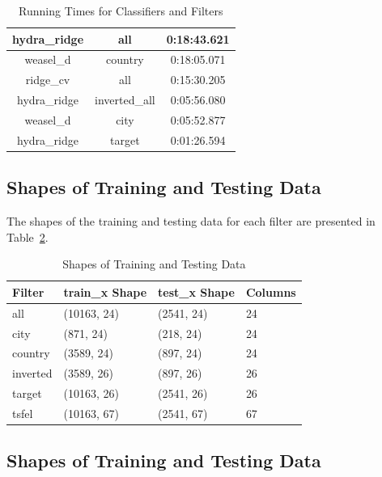 \documentclass{ieeeaccess}
\begin{document}
\begin{table}[ht]
\begin{tabular}{|c|c|c|}
    hydra\_ridge              & all               & 0:18:43.621                     \\ \hline
    weasel\_d                 & country           & 0:18:05.071                     \\ \hline
    ridge\_cv                 & all               & 0:15:30.205                     \\ \hline
    hydra\_ridge              & inverted\_all     & 0:05:56.080                     \\ \hline
    weasel\_d                 & city              & 0:05:52.877                     \\ \hline
    hydra\_ridge              & target            & 0:01:26.594                     \\ \hline
\end{tabular}
    \caption{Running Times for Classifiers and Filters}
    \label{tab:runtime}
    \end{table}

\subsection{Shapes of Training and Testing Data}

The shapes of the training and testing data for each filter are presented in Table~\ref{table:shapes}.

\begin{table}[ht]
    \centering
    \begin{tabular}{|l|l|l|l|}
    \hline
    \textbf{Filter} & \textbf{train\_x Shape} & \textbf{test\_x Shape} & \textbf{Columns} \\ \hline
    all       & (10163, 24) & (2541, 24) & 24 \\ \hline
    city      & (871, 24)   & (218, 24)  & 24 \\ \hline
    country   & (3589, 24)  & (897, 24)  & 24 \\ \hline
    inverted  & (3589, 26)  & (897, 26)  & 26 \\ \hline
    target    & (10163, 26) & (2541, 26) & 26 \\ \hline
    tsfel     & (10163, 67) & (2541, 67) & 67 \\ \hline
    \end{tabular}
    \caption{Shapes of Training and Testing Data}
    \label{table:shapes}
    \end{table}
    
\subsection{Shapes of Training and Testing Data}
\end{document}
